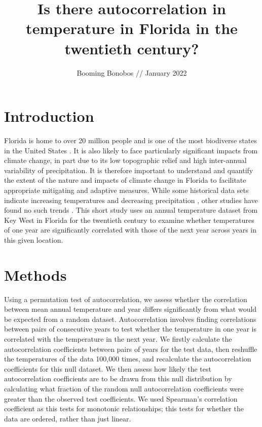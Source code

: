 \documentclass{article}
\title{\textbf{Is there autocorrelation in temperature in Florida in the twentieth century?\vspace{-0.5em}}}
\author{Booming Bonobos // January 2022}
\date{}
\begin{document}
\maketitle

\section{Introduction \vspace{-0.5em}}

    Florida is home to over 20 million people and is one of the most biodiverse states in the United States \cite{usda}. It is also likely to face particularly significant impacts from climate change, in part due to its low topographic relief and high inter-annual variability of precipitation. It is therefore important to understand and quantify the extent of the nature and impacts of climate change in Florida to facilitate appropriate mitigating and adaptive measures. While some historical data sets indicate increasing temperatures and decreasing precipitation \cite{irizarry2013historical}, other studies have found no such trends \cite{obeysekera2011climate}. This short study uses an annual temperature dataset from Key West in Florida for the twentieth century to examine whether temperatures of one year are significantly correlated with those of the next year across years in this given location. \vspace{-1em}

\section{Methods \vspace{-0.5em}}

Using a permutation test of autocorrelation, we assess whether the correlation between mean annual temperature and year differs significantly from what would be expected from a random dataset. Autocorrelation involves finding correlations between pairs of consecutive years to test whether the temperature in one year is correlated with the temperature in the next year. We firstly calculate the autocorrelation coefficients between pairs of years for the test data, then reshuffle the temperatures of the data 100,000 times, and recalculate the autocorrelation coefficients for this null dataset. We then assess how likely the test autocorrelation coefficients are to be drawn from this null distribution by calculating what fraction of the random null autocorrelation coefficients were greater than the observed test coefficients. We used Spearman's correlation coefficient as this tests for monotonic relationships; this tests for whether the data are ordered, rather than just linear. \vspace{-1em}
\end{document}
